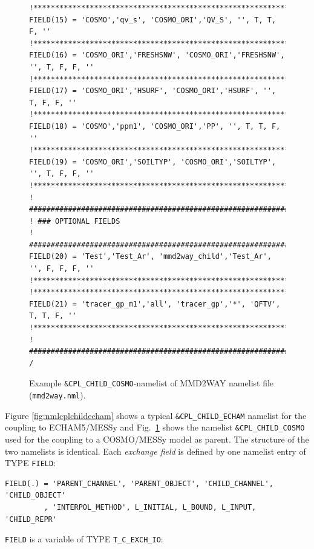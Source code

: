 \documentclass[11pt,twoside]{article}
\begin{document}
\begin{figure}
{\begin{verbatim}
!********************************************************************************
FIELD(15) = 'COSMO','qv_s', 'COSMO_ORI','QV_S', '', T, T, F, ''
!********************************************************************************
FIELD(16) = 'COSMO_ORI','FRESHSNW', 'COSMO_ORI','FRESHSNW', '', T, F, F, ''
!********************************************************************************
FIELD(17) = 'COSMO_ORI','HSURF', 'COSMO_ORI','HSURF', '', T, F, F, ''
!********************************************************************************
FIELD(18) = 'COSMO','ppm1', 'COSMO_ORI','PP', '', T, T, F, ''
!********************************************************************************
FIELD(19) = 'COSMO_ORI','SOILTYP', 'COSMO_ORI','SOILTYP', '', T, F, F, ''
!***************************************************************************
! ###############################################################################
! ### OPTIONAL FIELDS
! ###############################################################################
FIELD(20) = 'Test','Test_Ar', 'mmd2way_child','Test_Ar', '', F, F, F, ''
!********************************************************************************
!********************************************************************************
FIELD(21) = 'tracer_gp_m1','all', 'tracer_gp','*', 'QFTV', T, T, F, ''
!********************************************************************************
! ###############################################################################
/
\end{verbatim} 
}
\vspace*{-0.7cm}
\caption{Example {\tt \&CPL\_CHILD\_COSMO}-namelist of MMD2WAY namelist file ({\tt mmd2way.nml}). } 
\label{fig:nmlcplchildcosmo} 
\end{figure} 
Figure \ref{fig:nmlcplchildecham} shows a typical \verb|&CPL_CHILD_ECHAM|
namelist for the 
coupling to ECHAM5/MESSy and Fig.\ \ref{fig:nmlcplchildcosmo} shows the
namelist   
\verb|&CPL_CHILD_COSMO| used for the coupling to a COSMO/MESSy model as parent. 
The structure of the two namelists is identical. 
Each {\it exchange field}
 is defined by one namelist entry of {\footnotesize TYPE}
 \verb|FIELD|:
\begin{verbatim}
FIELD(.) = 'PARENT_CHANNEL', 'PARENT_OBJECT', 'CHILD_CHANNEL', 'CHILD_OBJECT' 
         , 'INTERPOL_METHOD', L_INITIAL, L_BOUND, L_INPUT, 'CHILD_REPR'
\end{verbatim}
\verb|FIELD| is a variable of {\footnotesize TYPE} \verb|T_C_EXCH_IO|:
\end{document}
